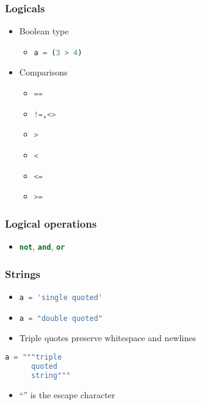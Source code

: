 \documentclass[xcolor=table,10pt,final]{beamer}
\begin{document}
\begin{frame}
  \frametitle{Logicals}
  \begin{itemize}
    \item Boolean type
      \begin{itemize}
        \item \lstinline[language=python]|a = (3 > 4)|
      \end{itemize}
    \item Comparisons
      \begin{itemize}
        \item \lstinline[language=python]|==|
        \item \lstinline[language=python]|!=,<>|
        \item \lstinline[language=python]|>|
        \item \lstinline[language=python]|<|
        \item \lstinline[language=python]|<=|
        \item \lstinline[language=python]|>=|
      \end{itemize}
  \end{itemize}
\end{frame}

\begin{frame}
  \frametitle{Logical operations}
  \begin{itemize}
    \item \lstinline[language=python]|not|, \lstinline[language=python]|and|, \lstinline[language=python]|or|
  \end{itemize}
\end{frame}

\begin{frame}[fragile]
  \frametitle{Strings}
  \begin{itemize}
    \item \lstinline[language=python]|a = 'single quoted'|
    \item \lstinline[language=python]|a = "double quoted"|
    \item Triple quotes preserve whitespace and newlines
  \end{itemize}
      \begin{lstlisting}[language=python]
      a = """triple
      quoted
      string"""
      \end{lstlisting}
      \begin{itemize}
    \item ``'' is the escape character
  \end{itemize}
\end{frame}
\end{document}
